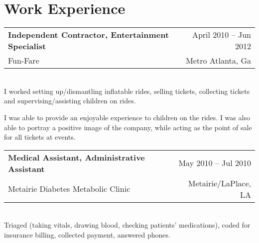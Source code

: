 \documentclass[10pt, letter]{article}
\makeatletter
\newlength{\currentparskip}
\newlength{\cvindent}
\newenvironment{cvsection}[1]{
    \section*{#1}   
}{
}
\newcommand{\cvitem}[6]{
    \setlength{\currentparskip}{\parskip}%
    \strut\hfill\begin{minipage}{\dimexpr\textwidth-\cvindent}
    \setlength{\parskip}{\currentparskip}%
    \begin{tabular*}{\linewidth}{@{}l@{\extracolsep{\fill}}r@{}}
        \textbf{#1} & #4 -- #5\\
        #2 & #3
    \end{tabular*}\\[.05cm]
    #6
    \end{minipage}
    \vspace{.3cm}
}
\makeatother
\begin{document}
\begin{cvsection}{Work Experience}
    \cvitem{Independent Contractor, Entertainment Specialist}{Fun-Fare}{Metro Atlanta, Ga}{April 2010}{Jun 2012}{I worked setting up/dismantling inflatable rides, selling tickets, collecting tickets and supervising/assisting children on rides. 

    I was able to provide an enjoyable experience to children on the rides. I was also able to portray a positive image of the company, while acting as the point of sale for all tickets at events.
    }

    \cvitem{Medical Assistant, Administrative Assistant}{Metairie Diabetes Metabolic Clinic}{Metairie/LaPlace, LA}{May 2010}{Jul 2010}{Triaged (taking vitals, drawing blood, checking patients’ medications), coded for insurance billing, collected payment, answered phones.}
 

\end{cvsection}
\end{document}
